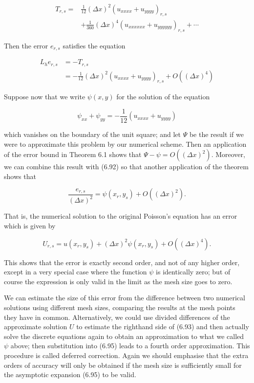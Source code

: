 \documentclass[10pt]{article}
\begin{document}
\[
\begin{aligned}
T_{r, s}= & \frac{1}{12}(\Delta x)^{2}\left(u_{x x x x}+u_{y y y y}\right)_{r, s} \\
& +\frac{1}{360}(\Delta x)^{4}\left(u_{x x x x x x}+u_{y y y y y y}\right)_{r, s}+\cdots
\end{aligned}
\]

Then the error \(e_{r, s}\) satisfies the equation

\[
\begin{aligned}
L_{h} e_{r, s} & =-T_{r, s} \\
& =-\frac{1}{12}(\Delta x)^{2}\left(u_{x x x x}+u_{y y y y}\right)_{r, s}+O\left((\Delta x)^{4}\right)
\end{aligned}
\]

Suppose now that we write \(\psi(x, y)\) for the solution of the equation

\[
\psi_{x x}+\psi_{y y}=-\frac{1}{12}\left(u_{x x x x}+u_{y y y y}\right)
\]

which vanishes on the boundary of the unit square; and let \(\Psi\) be the result if we were to approximate this problem by our numerical scheme. Then an application of the error bound in Theorem 6.1 shows that \(\Psi- \psi=O\left((\Delta x)^{2}\right)\). Moreover, we can combine this result with (6.92) so that another application of the theorem shows that

\[
\frac{e_{r, s}}{(\Delta x)^{2}}=\psi\left(x_{r}, y_{s}\right)+O\left((\Delta x)^{2}\right) .
\]

That is, the numerical solution to the original Poisson's equation has an error which is given by

\[
U_{r, s}=u\left(x_{r}, y_{s}\right)+(\Delta x)^{2} \psi\left(x_{r}, y_{s}\right)+O\left((\Delta x)^{4}\right) .
\]

This shows that the error is exactly second order, and not of any higher order, except in a very special case where the function \(\psi\) is identically zero; but of course the expression is only valid in the limit as the mesh size goes to zero.

We can estimate the size of this error from the difference between two numerical solutions using different mesh sizes, comparing the results at the mesh points they have in common. Alternatively, we could use divided differences of the approximate solution \(U\) to estimate the righthand side of (6.93) and then actually solve the discrete equations again to obtain an approximation to what we called \(\psi\) above; then substitution into (6.95) leads to a fourth order approximation. This procedure is called deferred correction. Again we should emphasise that the extra orders of accuracy will only be obtained if the mesh size is sufficiently small for the asymptotic expansion (6.95) to be valid.
\end{document}
